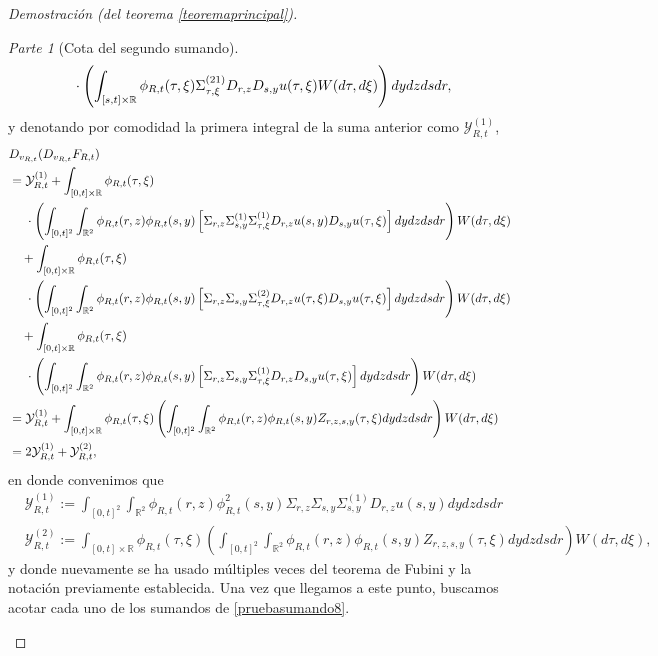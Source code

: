 \documentclass[letterpaper,twoside,12pt]{book}
\newcommand{\R}{\mathbb{R}}
\newcommand{\1}{\mathds{1}}
\theoremstyle{definition}
\theoremstyle{definition}
\theoremstyle{remark}
\newtheorem{proofpart}{Parte}
\theoremstyle{definition}
\theoremstyle{definition}
\theoremstyle{definition}
\theoremstyle{definition}
\theoremstyle{definition}
\begin{document}
\begin{proof}[Demostración (del teorema \ref{teoremaprincipal})]
\begin{proofpart}[Cota del segundo sumando]
\begin{align}
   &\ \ \ \ \cdot \left(\int_{[s,t]\times\R}\phi_{R,t}(\tau,\xi)\Sigma_{\tau,\xi}^{(21)}D_{r,z}D_{s,y}u(\tau,\xi)W(d\tau,d\xi)\right)dy dz ds dr,\notag
\end{align}
y denotando por comodidad la primera integral de la suma anterior como $\mathcal{Y}_{R,t}^{(1)}$,
\begin{align}
   &D_{v_{R,t}}(D_{v_{R,t}}F_{R,t})\notag\\
   &=\mathcal{Y}_{R,t}^{(1)}+\int_{[0,t]\times\R}\phi_{R,t}(\tau,\xi)\notag\\
   & \ \ \ \ \cdot \left(\int_{[0,t]^2}\int_{\R^2}\phi_{R,t}(r,z)\phi_{R,t}(s,y)\left[\Sigma_{r,z}\Sigma_{s,y}^{(1)}\Sigma_{\tau,\xi}^{(1)}D_{r,z}u(s,y)D_{s,y}u(\tau,\xi)\right]dy dz ds dr\right) W(d\tau,d\xi)\notag\\
   &\ \ \ +\int_{[0,t]\times\R}\phi_{R,t}(\tau,\xi)\notag\\
   &\ \ \ \ \cdot\left(\int_{[0,t]^2}\int_{\R^2}\phi_{R,t}(r,z)\phi_{R,t}(s,y)\left[\Sigma_{r,z}\Sigma_{s,y}\Sigma_{\tau,\xi}^{(2)}D_{r,z}u(\tau,\xi)D_{s,y}u(\tau,\xi)\right]dy dz ds dr\right) W(d\tau,d\xi)\notag\\
   &\ \ \ +\int_{[0,t]\times\R}\phi_{R,t}(\tau,\xi)\notag\\
   &\ \ \ \ \cdot\left(\int_{[0,t]^2}\int_{\R^2}\phi_{R,t}(r,z)\phi_{R,t}(s,y)\left[\Sigma_{r,z}\Sigma_{s,y}\Sigma_{\tau,\xi}^{(1)}D_{r,z}D_{s,y}u(\tau,\xi)\right]dy dz ds dr\right) W(d\tau,d\xi)\notag\\
   &=\mathcal{Y}_{R,t}^{(1)}+\int_{[0,t]\times\R}\phi_{R,t}(\tau,\xi)\left(\int_{[0,t]^2}\int_{\R^2}\phi_{R,t}(r,z)\phi_{R,t}(s,y)Z_{r,z,s,y}(\tau,\xi)dy dz ds dr\right)W(d\tau,d\xi)\notag\\
   &=2\mathcal{Y}_{R,t}^{(1)}+\mathcal{Y}_{R,t}^{(2)},\label{pruebasumando8}
\end{align}
en donde convenimos que
\begin{align*}
   &\mathcal{Y}_{R,t}^{(1)}:=\int_{[0,t]^2}\int_{\R^2}\phi_{R,t}(r,z)\phi_{R,t}^2(s,y)\Sigma_{r,z}\Sigma_{s,y}\Sigma^{(1)}_{s,y}D_{r,z}u(s,y)dy dz ds dr\\
   &\mathcal{Y}_{R,t}^{(2)}:=\int_{[0,t]\times\R}\phi_{R,t}(\tau,\xi)\left(\int_{[0,t]^2}\int_{\R^2}\phi_{R,t}(r,z)\phi_{R,t}(s,y)Z_{r,z,s,y}(\tau,\xi)dy dz ds dr\right)W(d\tau,d\xi),
\end{align*}
y donde nuevamente se ha usado múltiples veces del teorema de Fubini y la notación previamente establecida. Una vez que llegamos a este punto, buscamos acotar cada uno de los sumandos de \eqref{pruebasumando8}. 


\end{proofpart}
\end{proof}
\end{document}
